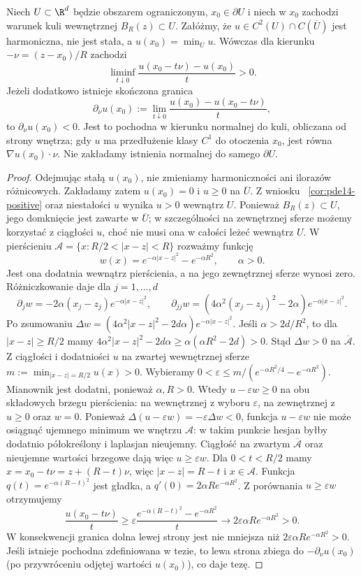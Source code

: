 \begin{twierdzenie}
\label{thm:pde14-hopf}
Niech $U\subset\R^d$ będzie obszarem ograniczonym,
$x_0\in\partial U$ i niech w $x_0$ zachodzi warunek kuli
wewnętrznej $B_R(z)\subset U$. Załóżmy, że
$u\in C^2(U)\cap C(\overline U)$ jest harmoniczna, nie jest
stała, a $u(x_0)=\min_{\overline U}u$.
Wówczas dla kierunku $-\nu=(z-x_0)/R$ zachodzi
\[
 \liminf_{t\downarrow0}\frac{u(x_0-t\nu)-u(x_0)}{t}>0.
\]
Jeżeli dodatkowo istnieje skończona granica
\[
 \partial_\nu u(x_0):=
 \lim_{t\downarrow0}\frac{u(x_0)-u(x_0-t\nu)}{t},
\]
to $\partial_\nu u(x_0)<0$. Jest to pochodna w kierunku
normalnej do kuli, obliczana od strony wnętrza; gdy $u$
ma przedłużenie klasy $C^1$ do otoczenia $x_0$,
jest równa $\nabla u(x_0)\cdot\nu$.
Nie zakładamy istnienia normalnej do samego $\partial U$.
\end{twierdzenie}
\begin{proof}
Odejmując stałą $u(x_0)$, nie zmieniamy harmoniczności
ani ilorazów różnicowych. Zakładamy zatem $u(x_0)=0$
i $u\ge0$ na $\overline U$. Z wniosku
~\ref{cor:pde14-positive} oraz niestałości $u$ wynika
$u>0$ wewnątrz $U$. Ponieważ $B_R(z)\subset U$,
jego domknięcie jest zawarte w $\overline U$; w szczególności
na zewnętrznej sferze możemy korzystać z ciągłości $u$,
choć nie musi ona w całości leżeć wewnątrz $U$.
W pierścieniu
$\mathcal A=\{x:R/2<|x-z|<R\}$ rozważmy funkcję
\[
 w(x)=e^{-\alpha|x-z|^2}-e^{-\alpha R^2},\qquad \alpha>0.
\]
Jest ona dodatnia wewnątrz pierścienia, a na jego zewnętrznej
sferze wynosi zero. Różniczkowanie daje dla $j=1,\ldots,d$
\[
 \partial_j w=-2\alpha(x_j-z_j)e^{-\alpha|x-z|^2},
 \qquad
 \partial_{jj}w=(4\alpha^2(x_j-z_j)^2-2\alpha)
 e^{-\alpha|x-z|^2}.
\]
Po zsumowaniu $\Delta w=(4\alpha^2|x-z|^2-2d\alpha)
e^{-\alpha|x-z|^2}$. Jeśli $\alpha>2d/R^2$, to dla
$|x-z|\ge R/2$ mamy
$4\alpha^2|x-z|^2-2d\alpha\ge\alpha(\alpha R^2-2d)>0$.
Stąd $\Delta w>0$ na $\overline{\mathcal A}$. Z ciągłości i dodatniości $u$
na zwartej wewnętrznej sferze
$m:=\min_{|x-z|=R/2}u(x)>0$. Wybieramy
$0<\varepsilon\le m/(e^{-\alpha R^2/4}-e^{-\alpha R^2})$.
Mianownik jest dodatni, ponieważ $\alpha,R>0$.
Wtedy $u-\varepsilon w\ge0$ na obu składowych brzegu
pierścienia: na wewnętrznej z wyboru $\varepsilon$, na
zewnętrznej z $u\ge0$ oraz $w=0$. Ponieważ
$\Delta(u-\varepsilon w)=-\varepsilon\Delta w<0$,
funkcja $u-\varepsilon w$ nie może osiągnąć ujemnego
minimum we wnętrzu $\mathcal A$: w takim punkcie hesjan
byłby dodatnio półokreślony i laplasjan nieujemny.
Ciągłość na zwartym $\overline{\mathcal A}$ oraz nieujemne
wartości brzegowe dają więc $u\ge\varepsilon w$.
Dla $0<t<R/2$ mamy $x=x_0-t\nu=z+(R-t)\nu$,
więc $|x-z|=R-t$ i $x\in\mathcal A$.
Funkcja $q(t)=e^{-\alpha(R-t)^2}$ jest gładka,
a $q'(0)=2\alpha R e^{-\alpha R^2}$.
Z porównania $u\ge\varepsilon w$ otrzymujemy
\[
 \frac{u(x_0-t\nu)}t\ge
 \varepsilon\frac{e^{-\alpha(R-t)^2}-e^{-\alpha R^2}}t
 \longrightarrow 2\varepsilon\alpha R e^{-\alpha R^2}>0.
\]
W konsekwencji granica dolna lewej strony jest nie mniejsza
niż $2\varepsilon\alpha R e^{-\alpha R^2}>0$.
Jeśli istnieje pochodna zdefiniowana w tezie, to lewa strona
zbiega do $-\partial_\nu u(x_0)$ (po przywróceniu odjętej
wartości $u(x_0)$), co daje tezę.
\end{proof}

